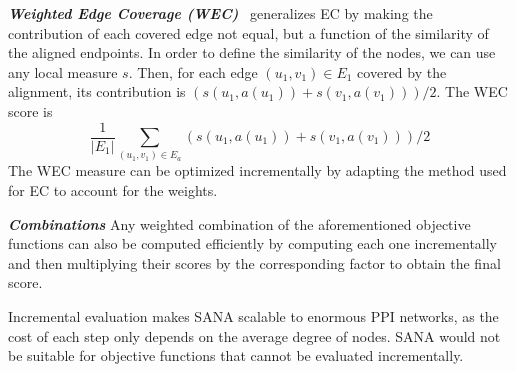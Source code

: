 \documentclass{bioinfo}
\begin{document}
\begin{methods}
\emph{\textbf{Weighted Edge Coverage (WEC)}}~\citep{WAVE} generalizes EC by making the contribution of each covered edge not equal, but a function of the similarity of the aligned endpoints. In order to define the similarity of the nodes, we can use any local measure $s$. Then, for each edge $(u_1,v_1)\in E_1$ covered by the alignment, its contribution is $\left(s(u_1,a(u_1))+s(v_1,a(v_1))\right)/2$. The WEC score is
$$\frac{1}{|E_1|}\sum_{(u_1,v_1)\in E_a} \left(s(u_1,a(u_1))+s(v_1,a(v_1))\right)/2$$
The WEC measure can be optimized incrementally by adapting the method used for EC to account for the weights.

\emph{\textbf{Combinations}} Any weighted combination of the aforementioned objective functions can also be computed efficiently by computing each one incrementally and then multiplying their scores by the corresponding factor to obtain the final score.

Incremental evaluation makes SANA scalable to enormous PPI networks, as the cost of each step only depends on the average degree of nodes. SANA would not be suitable for objective functions that cannot be evaluated incrementally.



\end{methods}
\end{document}
